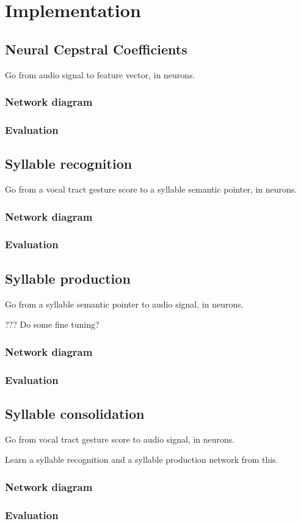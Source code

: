 \chapter{Implementation}

\section{Neural Cepstral Coefficients}

Go from audio signal to feature vector, in neurons.

\subsection{Network diagram}

\subsection{Evaluation}

\section{Syllable recognition}

Go from a vocal tract gesture score
to a syllable semantic pointer, in neurons.

\subsection{Network diagram}

\subsection{Evaluation}

\section{Syllable production}

Go from a syllable semantic pointer
to audio signal, in neurons.

??? Do some fine tuning?

\subsection{Network diagram}

\subsection{Evaluation}

\section{Syllable consolidation}

Go from vocal tract gesture score
to audio signal, in neurons.

Learn a syllable recognition
and a syllable production
network from this.

\subsection{Network diagram}

\subsection{Evaluation}
